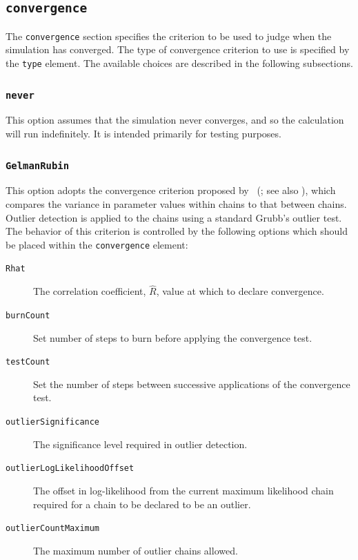 \subsection{{\tt convergence}}

The {\tt convergence} section specifies the criterion to be used to judge when the simulation has converged. The type of convergence criterion to use is specified by the {\tt type} element. The available choices are described in the following subsections.

\subsubsection{{\tt never}}

This option assumes that the simulation never converges, and so the calculation will run indefinitely. It is intended primarily for testing purposes.

\subsubsection{{\tt GelmanRubin}}

This option adopts the convergence criterion proposed by \citeauthor{gelman_a._inference_1992}~(\citeyear{gelman_a._inference_1992}; see also \citealt{brooks_general_1998}), which compares the variance in parameter values within chains to that between chains. Outlier detection is applied to the chains using a standard Grubb's outlier test. The behavior of this criterion is controlled by the following options which should be placed within the {\tt convergence} element:
\begin{description}
\item [{\tt Rhat}] The correlation coefficient, $\hat{R}$, value at which to declare convergence.
\item [{\tt burnCount}] Set number of steps to burn before applying the convergence test.
\item [{\tt testCount}] Set the number of steps between successive applications of the convergence test.
\item [{\tt outlierSignificance}] The significance level required in outlier detection.
\item [{\tt outlierLogLikelihoodOffset}] The offset in log-likelihood from the current maximum likelihood chain required for a chain to be declared to be an outlier.
\item [{\tt outlierCountMaximum}] The maximum number of outlier chains allowed.
\end{description}

